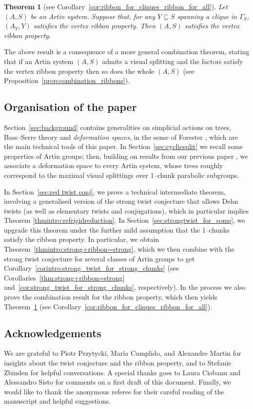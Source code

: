 \documentclass[svgnames]{amsart}
\theoremstyle{plain}
\newtheorem{thmintro}{Theorem}
\theoremstyle{definition}
\begin{document}
\begin{thmintro}[see Corollary~\ref{cor:ribbon_for_cliques_ribbon_for_all}]\label{thmintro:ribbon_extend} 
    Let $(A,S)$ be an Artin system. Suppose that, for any $Y \subseteq S$ spanning a clique in $\Gamma_S$, $(A_Y,Y)$ satisfies the vertex ribbon property. Then $(A,S)$ satisfies the vertex ribbon property. 
\end{thmintro}
The above result is a consequence of a more general combination theorem, stating that if an Artin system $(A,S)$ admits a visual splitting and the factors satisfy the vertex ribbon property then so does the whole $(A,S)$ (see Proposition~\ref{prop:combination_ribbons}).


\subsection*{Organisation of the paper}
Section~\ref{sec:background} contains generalities on simplicial actions on trees, Bass--Serre theory and \emph{deformation spaces}, in the sense of Forester \cite{forester}, which are the main technical tools of this paper. In Section~\ref{sec:cyclicsplit} we recall some properties of Artin groups; then, building on results from our previous paper \cite{JonManSar_JSJSpl}, we associate a deformation space to every Artin system, whose trees roughly correspond to the maximal visual splittings over 1--chunk parabolic subgroups. 


In Section~\ref{sec:red twist conj}, we prove a technical intermediate theorem, involving a generalised version of the strong twist conjecture that allows Dehn twists (as well as elementary twists and conjugations), which in particular implies Theorem \ref{thmintro:refrigidreduction}. In Section~\ref{sec:strongtwist_for_some}, we upgrade this theorem under the further mild assumption that the 1--chunks satisfy the ribbon property. In particular, we obtain Theorem~\ref{thmintro:strong+ribbon=strong}, which we then combine with the strong twist conjecture for several classes of Artin groups to get Corollary~\ref{corintro:strong_twist_for_strong_chunks} (see Corollaries~\ref{thm:strong+ribbon=strong} and~\ref{cor:strong_twist_for_strong_chunks}, respectively). In the process we also prove the combination result for the ribbon property, which then yields Theorem~\ref{thmintro:ribbon_extend} (see Corollary~\ref{cor:ribbon_for_cliques_ribbon_for_all}).

\subsection*{Acknowledgements}
We are grateful to Piotr Przytycki, María Cumplido, and Alexandre Martin for insights about the twist conjecture and the ribbon property, and to Stefanie Zbinden for helpful conversations. A special thanks goes to Laura Ciobanu and Alessandro Sisto for comments on a first draft of this document. Finally, we would like to thank the anonymous referee for their careful reading of the manuscript and helpful suggestions. 
\end{document}
